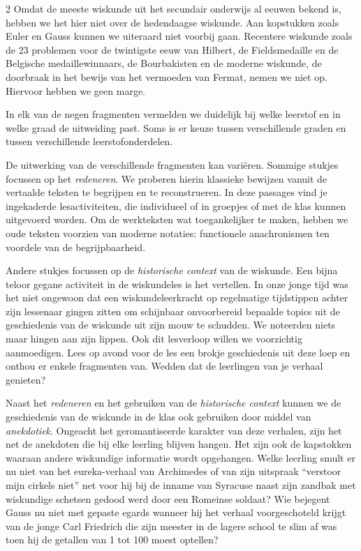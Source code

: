 \begin{multicols}{2}
    Omdat de meeste wiskunde uit het secundair onderwijs al eeuwen bekend is, hebben we het hier niet over de hedendaagse wiskunde. Aan kopstukken zoals Euler en Gauss kunnen we uiteraard niet voorbij gaan. Recentere wiskunde zoals de 23 problemen voor de twintigste eeuw van Hilbert, de Fieldsmedaille en de Belgische medaillewinnaars, de Bourbakisten en de moderne wiskunde, de doorbraak in het bewijs van het vermoeden van Fermat, nemen we niet op. Hiervoor hebben we geen marge. 

    In elk van de negen fragmenten vermelden we duidelijk bij welke leerstof en in welke graad de uitweiding past. Soms is er keuze tussen verschillende graden en tussen verschillende leerstofonderdelen. 
    
    De uitwerking van de verschillende fragmenten kan variëren. Sommige stukjes focussen op het \emph{redeneren}. We proberen hierin klassieke bewijzen vanuit de vertaalde teksten te begrijpen en te reconstrueren. In deze passages vind je ingekaderde lesactiviteiten, die individueel of in groepjes of met de klas kunnen uitgevoerd worden. Om de werkteksten wat toegankelijker te maken, hebben we oude teksten voorzien van moderne notaties: functionele anachronismen ten voordele van de begrijpbaarheid.
    
    Andere stukjes focussen op de \emph{historische context} van de wiskunde. Een bijna teloor gegane activiteit in de wiskundeles is het vertellen. In onze jonge tijd was het niet ongewoon dat een wiskundeleerkracht op regelmatige tijdstippen achter zijn lessenaar gingen zitten om schijnbaar onvoorbereid bepaalde topics uit de geschiedenis van de wiskunde uit zijn mouw te schudden. We noteerden niets maar hingen aan zijn lippen. Ook dit lesverloop willen we voorzichtig aanmoedigen. Lees op avond voor de les een brokje geschiedenis uit deze loep en onthou er enkele fragmenten van. Wedden dat de leerlingen van je verhaal genieten?

    Naast het \emph{redeneren} en het gebruiken van de \emph{historische context} kunnen we de geschiedenis van de wiskunde in de klas ook gebruiken door middel van \emph{anekdotiek}. Ongeacht het geromantiseerde karakter van deze verhalen, zijn het net de anekdoten die bij elke leerling blijven hangen. Het zijn ook de kapstokken waaraan andere wiskundige informatie wordt opgehangen. Welke leerling smult er nu niet van het eureka-verhaal van Archimedes of van zijn uitspraak ``verstoor mijn cirkels niet'' net voor hij bij de inname van Syracuse naast zijn zandbak met wiskundige schetsen gedood werd door een Romeinse soldaat? Wie bejegent Gauss nu niet met gepaste egards wanneer hij het verhaal voorgeschoteld krijgt van de jonge Carl Friedrich die zijn meester in de lagere school te slim af was toen hij de getallen van 1 tot 100 moest optellen?


\end{multicols}
